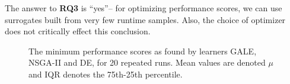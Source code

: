 \documentclass{sig-alternative}
\begin{document}
\begin{myshadowbox}
The answer to {\bf RQ3} is ``yes''-- for optimizing performance scores, we can use surrogates built from very few runtime samples. Also, the choice of optimizer does not critically effect this conclusion.
\end{myshadowbox}


\begin{figure}
\caption{The minimum performance scores as found by learners GALE, NSGA-II and DE, for  20 repeated
runs. Mean values are denoted $\mu$ and IQR denotes the 75th-25th percentile.}
\label{fig:external_validity}
\end{figure}
\end{document}
